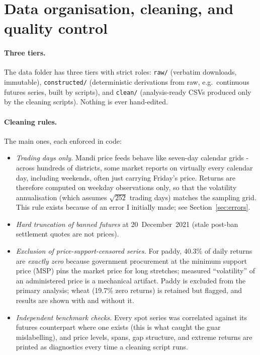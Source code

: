 \documentclass[11pt]{article}
\begin{document}
\section{Data organisation, cleaning, and quality control}
\label{sec:cleaning}

\paragraph{Three tiers.} The data folder has three tiers with strict roles:
\texttt{raw/} (verbatim downloads, immutable), \texttt{constructed/} (deterministic
derivations from raw, e.g.\ continuous futures series, built by scripts),
and \texttt{clean/} (analysis-ready CSVs produced only by the cleaning scripts).
Nothing is ever hand-edited.

\paragraph{Cleaning rules.} The main ones, each enforced in code:
\begin{itemize}[leftmargin=1.6em,itemsep=1pt]
  \item \emph{Trading days only.} Mandi price feeds behave like seven-day calendar grids
 - across hundreds of districts, some market reports on virtually every calendar
        day, including weekends, often just carrying Friday's price. Returns are therefore
        computed on weekday observations only, so that the volatility annualisation
        (which assumes $\sqrt{252}$ trading days) matches the sampling grid. This rule
        exists because of an error I initially made; see Section~\ref{sec:errors}.
  \item \emph{Hard truncation of banned futures} at 20~December~2021 (stale post-ban
        settlement quotes are not prices).
  \item \emph{Exclusion of price-support-censored series.} For paddy, 40.3\% of daily
        returns are \emph{exactly zero} because government procurement at the minimum
        support price (MSP) pins the market price for long stretches; measured
        ``volatility'' of an administered price is a mechanical artifact. Paddy is
        excluded from the primary analysis; wheat (19.7\% zero returns) is retained but
        flagged, and results are shown with and without it.
  \item \emph{Independent benchmark checks.} Every spot series was correlated against its
        futures counterpart where one exists (this is what caught the guar mislabelling),
        and price levels, spans, gap structure, and extreme returns are printed as
        diagnostics every time a cleaning script runs.
\end{itemize}
\end{document}

